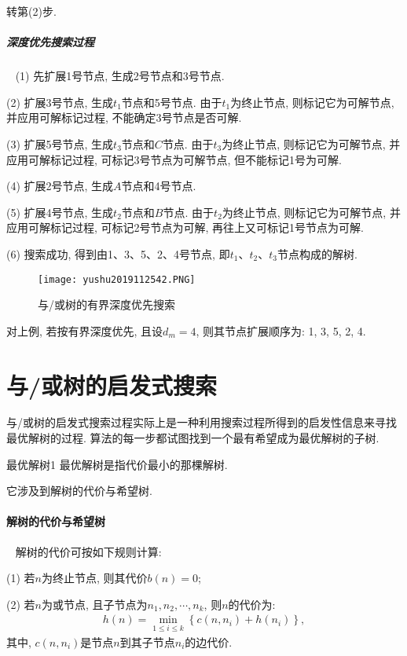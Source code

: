    \quad{} 转第(2)步.
\subparagraph{深度优先搜索过程}~{}
(1) 先扩展1号节点, 生成2号节点和3号节点.

(2) 扩展3号节点, 生成$t_1$节点和5号节点. 由于$t_1$为终止节点, 则标记它为可解节点, 并应用可解标记过程, 不能确定3号节点是否可解.

(3) 扩展5号节点, 生成$t_3$节点和$C$节点. 由于$t_3$为终止节点, 则标记它为可解节点, 并应用可解标记过程, 可标记3号节点为可解节点, 但不能标记1号为可解.

(4) 扩展2号节点, 生成$A$节点和4号节点.

(5) 扩展4号节点, 生成$t_2$节点和$B$节点. 由于$t_2$为终止节点, 则标记它为可解节点, 并应用可解标记过程, 可标记2号节点为可解, 再往上又可标记1号节点为可解.

(6) 搜索成功, 得到由1、3、5、2、4号节点, 即$t_1$、$t_2$、$t_3$节点构成的解树.
\begin{figure}[H]
    \centering
    \texttt{[image: yushu2019112542.PNG]}
    \caption{与/或树的有界深度优先搜索}
    \label{AI32fig42}
\end{figure}
对上例, 若按有界深度优先, 且设$d_m=4$, 则其节点扩展顺序为: 1, 3, 5, 2, 4.
\section{与/或树的启发式搜索}
    与/或树的启发式搜索过程实际上是一种利用搜索过程所得到的启发性信息来寻找最优解树的过程. 算法的每一步都试图找到一个最有希望成为最优解树的子树.
\begin{mydef}{最优解树}{1}
    最优解树是指代价最小的那棵解树.
\end{mydef}
它涉及到解树的代价与希望树.
\paragraph{解树的代价与希望树}~{}
解树的代价可按如下规则计算:

(1) 若$n$为终止节点, 则其代价$b(n)=0$;

(2) 若$n$为或节点, 且子节点为$n_1, n_2, \cdots, n_k$, 则$n$的代价为:
    \begin{align}
        h(n)=\min _{1 \leq i \leq k}\left\{c\left(n, n_{i}\right)+h\left(n_{i}\right)\right\},
    \end{align}
其中, $c(n, n_i )$是节点$n$到其子节点$n_i$的边代价.

